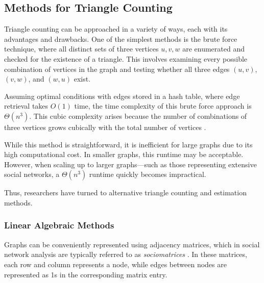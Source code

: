\documentclass[12pt]{article}
\begin{document}
\subsection{Methods for Triangle Counting}

Triangle counting can be approached in a variety of ways, each with its advantages and drawbacks. 
One of the simplest methods is the brute force technique, where all distinct sets of three vertices ${u, v, w}$ are enumerated and checked for the existence of a triangle.
This involves examining every possible combination of vertices in the graph and testing whether all three edges $(u, v)$, $(v, w)$, and $(w, u)$ exist. 

Assuming optimal conditions with edges stored in a hash table, where edge retrieval takes $O(1)$ time, the time complexity of this brute force approach is $\Theta(n^3)$. 
This cubic complexity arises because the number of combinations of three vertices grows cubically with the total number of vertices \cite{al_hasan_triangle_2018}. 

While this method is straightforward, it is inefficient for large graphs due to its high computational cost.
In smaller graphs, this runtime may be acceptable.
However, when scaling up to larger graphs—such as those representing extensive social networks, a $\Theta(n^3)$ runtime quickly becomes impractical.

Thus, researchers have turned to alternative triangle counting and estimation methods.

\subsubsection{Linear Algebraic Methods}

Graphs can be conveniently represented using adjacency matrices, which in social network analysis are typically referred to as \emph{sociomatrices} \cite{beum_method_1950}. 
In these matrices, each row and column represents a node, while edges between nodes are represented as 1s in the corresponding matrix entry.
\end{document}
